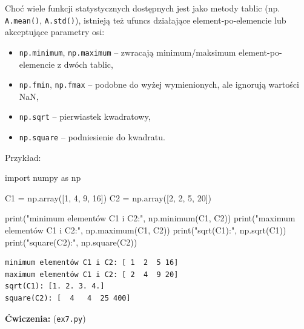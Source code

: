 \documentclass[
  letterpaper,
  DIV=11,
  numbers=noendperiod]{scrreprt}
\newenvironment{Shaded}{\begin{snugshade}}{\end{snugshade}}
\newcommand{\BuiltInTok}[1]{\textcolor[rgb]{0.00,0.23,0.31}{#1}}
\newcommand{\DecValTok}[1]{\textcolor[rgb]{0.68,0.00,0.00}{#1}}
\newcommand{\ImportTok}[1]{\textcolor[rgb]{0.00,0.46,0.62}{#1}}
\newcommand{\NormalTok}[1]{\textcolor[rgb]{0.00,0.23,0.31}{#1}}
\newcommand{\OperatorTok}[1]{\textcolor[rgb]{0.37,0.37,0.37}{#1}}
\newcommand{\StringTok}[1]{\textcolor[rgb]{0.13,0.47,0.30}{#1}}
\providecommand{\tightlist}{%
  \setlength{\itemsep}{0pt}\setlength{\parskip}{0pt}}\usepackage{longtable,booktabs,array}
\begin{document}
Choć wiele funkcji statystycznych dostępnych jest jako metody tablic
(np. \texttt{A.mean()}, \texttt{A.std()}), istnieją też ufuncs
działające element-po-elemencie lub akceptujące parametry osi:

\begin{itemize}
\tightlist
\item
  \texttt{np.minimum}, \texttt{np.maximum} -- zwracają minimum/maksimum
  element-po-elemencie z dwóch tablic,
\item
  \texttt{np.fmin}, \texttt{np.fmax} -- podobne do wyżej wymienionych,
  ale ignorują wartości NaN,
\item
  \texttt{np.sqrt} -- pierwiastek kwadratowy,
\item
  \texttt{np.square} -- podniesienie do kwadratu.
\end{itemize}

Przykład:

\begin{Shaded}
\begin{Highlighting}[]
\ImportTok{import}\NormalTok{ numpy }\ImportTok{as}\NormalTok{ np}

\NormalTok{C1 }\OperatorTok{=}\NormalTok{ np.array([}\DecValTok{1}\NormalTok{, }\DecValTok{4}\NormalTok{, }\DecValTok{9}\NormalTok{, }\DecValTok{16}\NormalTok{])}
\NormalTok{C2 }\OperatorTok{=}\NormalTok{ np.array([}\DecValTok{2}\NormalTok{, }\DecValTok{2}\NormalTok{, }\DecValTok{5}\NormalTok{, }\DecValTok{20}\NormalTok{])}

\BuiltInTok{print}\NormalTok{(}\StringTok{"minimum elementów C1 i C2:"}\NormalTok{, np.minimum(C1, C2))}
\BuiltInTok{print}\NormalTok{(}\StringTok{"maximum elementów C1 i C2:"}\NormalTok{, np.maximum(C1, C2))}
\BuiltInTok{print}\NormalTok{(}\StringTok{"sqrt(C1):"}\NormalTok{, np.sqrt(C1))}
\BuiltInTok{print}\NormalTok{(}\StringTok{"square(C2):"}\NormalTok{, np.square(C2))}
\end{Highlighting}
\end{Shaded}

\begin{verbatim}
minimum elementów C1 i C2: [ 1  2  5 16]
maximum elementów C1 i C2: [ 2  4  9 20]
sqrt(C1): [1. 2. 3. 4.]
square(C2): [  4   4  25 400]
\end{verbatim}

\textbf{Ćwiczenia:} (\texttt{ex7.py})
\end{document}
